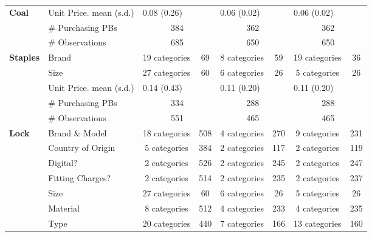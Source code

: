 \begin{longtable}{llccccccccc}
 \midrule 
 \multirow{3}{*}{\textbf{Coal}}
 & Unit Price. mean (s.d.) & \multicolumn{3}{l}{0.08 (0.26)} & \multicolumn{3}{l}{0.06 (0.02)} & \multicolumn{3}{l}{0.06 (0.02)} \\* 
 & \# Purchasing PBs & \multicolumn{3}{c}{384} & \multicolumn{3}{c}{362} & \multicolumn{3}{c}{362} \\* 
 & \# Observations & \multicolumn{3}{c}{685} & \multicolumn{3}{c}{650} & \multicolumn{3}{c}{650} \\* 
 \midrule 
 \multirow{5}{*}{\textbf{Staples}} & Brand & \multicolumn{2}{c}{19 categories} & 69 & \multicolumn{2}{c}{8 categories} & 59 & \multicolumn{2}{c}{19 categories} & 36 \\* 
 & Size & \multicolumn{2}{c}{27 categories} & 60 & \multicolumn{2}{c}{6 categories} & 26 & \multicolumn{2}{c}{5 categories} & 26 \\* 
 \cmidrule{2-11} 
 & Unit Price. mean (s.d.) & \multicolumn{3}{l}{0.14 (0.43)} & \multicolumn{3}{l}{0.11 (0.20)} & \multicolumn{3}{l}{0.11 (0.20)} \\* 
 & \# Purchasing PBs & \multicolumn{3}{c}{334} & \multicolumn{3}{c}{288} & \multicolumn{3}{c}{288} \\* 
 & \# Observations & \multicolumn{3}{c}{551} & \multicolumn{3}{c}{465} & \multicolumn{3}{c}{465} \\* 
 \midrule 
 \multirow{10}{*}{\textbf{Lock}} & Brand \& Model & \multicolumn{2}{c}{18 categories} & 508 & \multicolumn{2}{c}{4 categories} & 270 & \multicolumn{2}{c}{9 categories} & 231 \\* 
 & Country of Origin & \multicolumn{2}{c}{5 categories} & 384 & \multicolumn{2}{c}{2 categories} & 117 & \multicolumn{2}{c}{2 categories} & 119 \\* 
 & Digital? & \multicolumn{2}{c}{2 categories} & 526 & \multicolumn{2}{c}{2 categories} & 245 & \multicolumn{2}{c}{2 categories} & 247 \\* 
 & Fitting Charges? & \multicolumn{2}{c}{2 categories} & 514 & \multicolumn{2}{c}{2 categories} & 235 & \multicolumn{2}{c}{2 categories} & 237 \\* 
 & Size & \multicolumn{2}{c}{27 categories} & 60 & \multicolumn{2}{c}{6 categories} & 26 & \multicolumn{2}{c}{5 categories} & 26 \\* 
 & Material & \multicolumn{2}{c}{8 categories} & 512 & \multicolumn{2}{c}{4 categories} & 233 & \multicolumn{2}{c}{4 categories} & 235 \\* 
 & Type & \multicolumn{2}{c}{20 categories} & 440 & \multicolumn{2}{c}{7 categories} & 166 & \multicolumn{2}{c}{13 categories} & 160 \\* 

\end{longtable}
